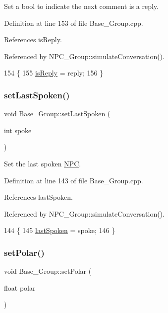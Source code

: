 Set a bool to indicate the next comment is a reply. 



Definition at line 153 of file Base\+\_\+\+Group.\+cpp.



References is\+Reply.



Referenced by N\+P\+C\+\_\+\+Group\+::simulate\+Conversation().


\begin{DoxyCode}
154 \{
155     \hyperlink{class_base___group_ad9dc72068ed8309820873de4084aa602}{isReply} = reply;
156 \}
\end{DoxyCode}
\mbox{\label{class_base___group_a07e58c944f222f5c3d3b33c8adf83d14}} 
\subsubsection{\texorpdfstring{set\+Last\+Spoken()}{setLastSpoken()}}
{\footnotesize\ttfamily void Base\+\_\+\+Group\+::set\+Last\+Spoken (\begin{DoxyParamCaption}\item[{int}]{spoke }\end{DoxyParamCaption})}



Set the last spoken \hyperlink{class_n_p_c}{N\+PC}. 



Definition at line 143 of file Base\+\_\+\+Group.\+cpp.



References last\+Spoken.



Referenced by N\+P\+C\+\_\+\+Group\+::simulate\+Conversation().


\begin{DoxyCode}
144 \{
145     \hyperlink{class_base___group_aa031e7ea2c490eae2e8101fb4093da00}{lastSpoken} = spoke;
146 \}
\end{DoxyCode}
\mbox{\label{class_base___group_a36ef627854f502a064fca8aea44a22fe}} 
\subsubsection{\texorpdfstring{set\+Polar()}{setPolar()}}
{\footnotesize\ttfamily void Base\+\_\+\+Group\+::set\+Polar (\begin{DoxyParamCaption}\item[{float}]{polar }\end{DoxyParamCaption})}



